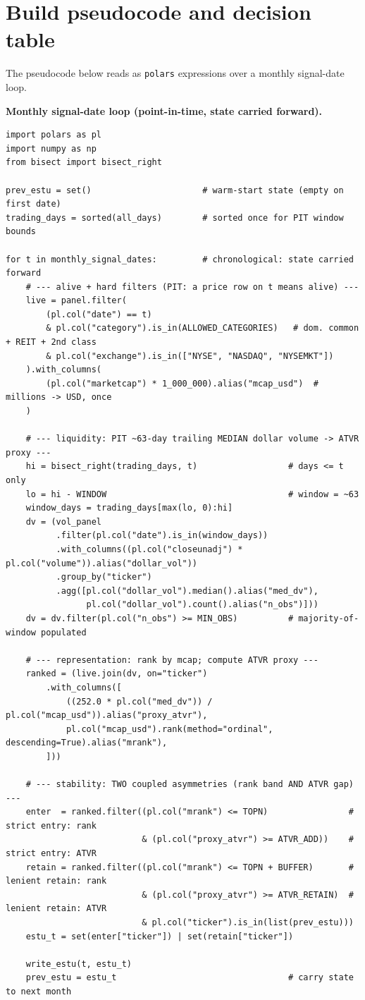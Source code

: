 \documentclass[11pt]{article}
\theoremstyle{definition}
\theoremstyle{plain}
\theoremstyle{remark}
\begin{document}
\appendix
\section{Build pseudocode and decision table}\label{app:code}

The pseudocode below reads as \texttt{polars} expressions over a monthly signal-date loop.

\medskip
\noindent\textbf{Monthly signal-date loop (point-in-time, state carried forward).}
{\footnotesize
\begin{verbatim}
import polars as pl
import numpy as np
from bisect import bisect_right

prev_estu = set()                      # warm-start state (empty on first date)
trading_days = sorted(all_days)        # sorted once for PIT window bounds

for t in monthly_signal_dates:         # chronological: state carried forward
    # --- alive + hard filters (PIT: a price row on t means alive) ---
    live = panel.filter(
        (pl.col("date") == t)
        & pl.col("category").is_in(ALLOWED_CATEGORIES)   # dom. common + REIT + 2nd class
        & pl.col("exchange").is_in(["NYSE", "NASDAQ", "NYSEMKT"])
    ).with_columns(
        (pl.col("marketcap") * 1_000_000).alias("mcap_usd")  # millions -> USD, once
    )

    # --- liquidity: PIT ~63-day trailing MEDIAN dollar volume -> ATVR proxy ---
    hi = bisect_right(trading_days, t)                  # days <= t only
    lo = hi - WINDOW                                    # window = ~63
    window_days = trading_days[max(lo, 0):hi]
    dv = (vol_panel
          .filter(pl.col("date").is_in(window_days))
          .with_columns((pl.col("closeunadj") * pl.col("volume")).alias("dollar_vol"))
          .group_by("ticker")
          .agg([pl.col("dollar_vol").median().alias("med_dv"),
                pl.col("dollar_vol").count().alias("n_obs")]))
    dv = dv.filter(pl.col("n_obs") >= MIN_OBS)          # majority-of-window populated

    # --- representation: rank by mcap; compute ATVR proxy ---
    ranked = (live.join(dv, on="ticker")
        .with_columns([
            ((252.0 * pl.col("med_dv")) / pl.col("mcap_usd")).alias("proxy_atvr"),
            pl.col("mcap_usd").rank(method="ordinal", descending=True).alias("mrank"),
        ]))

    # --- stability: TWO coupled asymmetries (rank band AND ATVR gap) ---
    enter  = ranked.filter((pl.col("mrank") <= TOPN)                # strict entry: rank
                           & (pl.col("proxy_atvr") >= ATVR_ADD))    # strict entry: ATVR
    retain = ranked.filter((pl.col("mrank") <= TOPN + BUFFER)       # lenient retain: rank
                           & (pl.col("proxy_atvr") >= ATVR_RETAIN)  # lenient retain: ATVR
                           & pl.col("ticker").is_in(list(prev_estu)))
    estu_t = set(enter["ticker"]) | set(retain["ticker"])

    write_estu(t, estu_t)
    prev_estu = estu_t                                  # carry state to next month
\end{verbatim}
}
\end{document}
